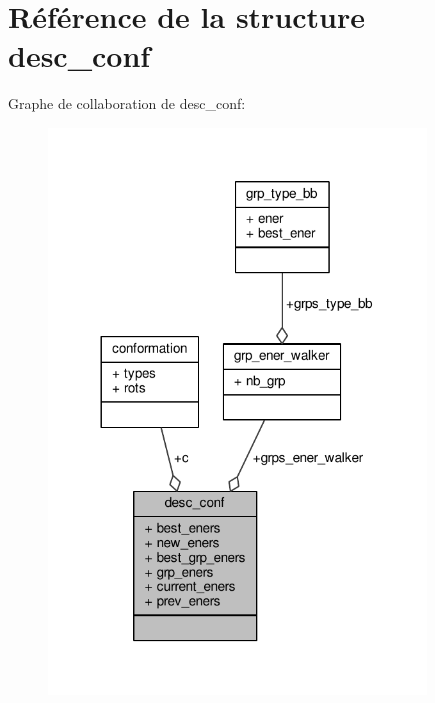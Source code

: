 \hypertarget{structdesc__conf}{\section{Référence de la structure desc\+\_\+conf}
\label{structdesc__conf}
}


Graphe de collaboration de desc\+\_\+conf\+:\nopagebreak
\begin{figure}[H]
\begin{center}
\leavevmode
\includegraphics[width=284pt]{structdesc__conf__coll__graph}
\end{center}
\end{figure}
